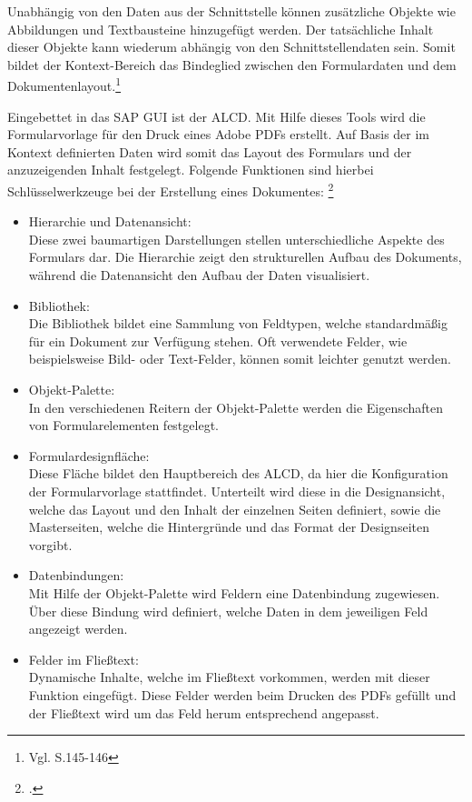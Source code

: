 Unabhängig von den Daten aus der Schnittstelle können zusätzliche Objekte wie Abbildungen und Textbausteine hinzugefügt werden. Der tatsächliche Inhalt dieser Objekte kann wiederum abhängig von den Schnittstellendaten sein. Somit bildet der Kontext-Bereich das Bindeglied zwischen den Formulardaten und dem Dokumentenlayout.\footnote{Vgl. \cite{Hauser.2015} S.145-146} 

Eingebettet in das SAP \ac{GUI} ist der \ac{ALCD}. Mit Hilfe dieses Tools wird die Formularvorlage für den Druck eines Adobe \ac{PDF}s erstellt. Auf Basis der im Kontext definierten Daten wird somit das Layout des Formulars und der anzuzeigenden Inhalt festgelegt. Folgende Funktionen sind hierbei Schlüsselwerkzeuge bei der Erstellung eines Dokumentes: \footcite{Hauser.2015}

\begin{itemize}
	\item Hierarchie und Datenansicht: \\
		Diese zwei baumartigen Darstellungen stellen unterschiedliche Aspekte des Formulars dar. Die Hierarchie zeigt den strukturellen Aufbau des Dokuments, während die Datenansicht den Aufbau der Daten visualisiert.
	\item Bibliothek: \\
		Die Bibliothek bildet eine Sammlung von Feldtypen, welche standardmäßig für ein Dokument zur Verfügung stehen. Oft verwendete Felder, wie beispielsweise Bild- oder Text-Felder, können somit leichter genutzt werden.
	\item Objekt-Palette: \\
		In den verschiedenen Reitern der Objekt-Palette werden die Eigenschaften von Formularelementen festgelegt.
	\item Formulardesignfläche: \\
		Diese Fläche bildet den Hauptbereich des \ac{ALCD}, da hier die Konfiguration der Formularvorlage stattfindet. Unterteilt wird diese in die Designansicht, welche das Layout und den Inhalt der einzelnen Seiten definiert, sowie die Masterseiten, welche die Hintergründe und das Format der Designseiten vorgibt.
	\item Datenbindungen: \\
		Mit Hilfe der Objekt-Palette wird Feldern eine Datenbindung zugewiesen. Über diese Bindung wird definiert, welche Daten in dem jeweiligen Feld angezeigt werden.
	\item Felder im Fließtext: \\
		Dynamische Inhalte, welche im Fließtext vorkommen, werden mit dieser Funktion eingefügt. Diese Felder werden beim Drucken des \ac{PDF}s gefüllt und der Fließtext wird um das Feld herum entsprechend angepasst.

\end{itemize}
